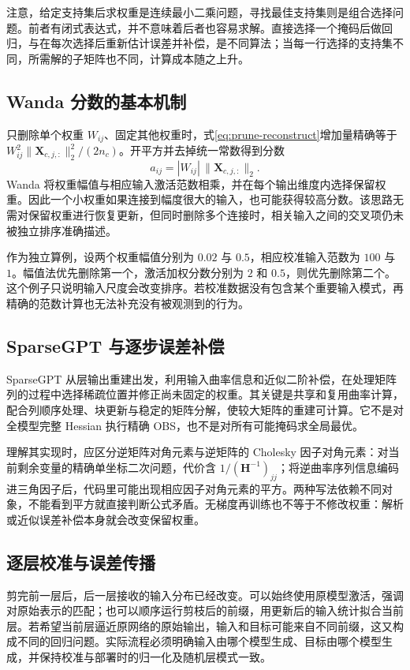 \documentclass[UTF8,12pt,a4paper,fontset=fandol]{ctexart}
\begin{document}
注意，给定支持集后求权重是连续最小二乘问题，寻找最佳支持集则是组合选择问题。前者有闭式表达式，并不意味着后者也容易求解。直接选择一个掩码后做回归，与在每次选择后重新估计误差并补偿，是不同算法；当每一行选择的支持集不同，所需解的子矩阵也不同，计算成本随之上升。

\subsection{Wanda 分数的基本机制}
只删除单个权重 $W_{ij}$、固定其他权重时，式\eqref{eq:prune-reconstruct}增加量精确等于 $W_{ij}^2\|\mathbf X_{c,j,:}\|_2^2/(2n_c)$。开平方并去掉统一常数得到分数
\begin{equation}
 a_{ij}=|W_{ij}|\,\|\mathbf X_{c,j,:}\|_2.
 \label{eq:prune-wanda}
\end{equation}
Wanda 将权重幅值与相应输入激活范数相乘，并在每个输出维度内选择保留权重\cite{sun2024}。因此一个小权重如果连接到幅度很大的输入，也可能获得较高分数。该思路无需对保留权重进行恢复更新，但同时删除多个连接时，相关输入之间的交叉项仍未被独立排序准确描述。

作为独立算例，设两个权重幅值分别为 $0.02$ 与 $0.5$，相应校准输入范数为 $100$ 与 $1$。幅值法优先删除第一个，激活加权分数分别为 $2$ 和 $0.5$，则优先删除第二个。这个例子只说明输入尺度会改变排序。若校准数据没有包含某个重要输入模式，再精确的范数计算也无法补充没有被观测到的行为。

\subsection{SparseGPT 与逐步误差补偿}
SparseGPT 从层输出重建出发，利用输入曲率信息和近似二阶补偿，在处理矩阵列的过程中选择稀疏位置并修正尚未固定的权重\cite{frantar2023}。其关键是共享和复用曲率计算，配合列顺序处理、块更新与稳定的矩阵分解，使较大矩阵的重建可计算。它不是对全模型完整 Hessian 执行精确 OBS，也不是对所有可能掩码求全局最优。

理解其实现时，应区分逆矩阵对角元素与逆矩阵的 Cholesky 因子对角元素：对当前剩余变量的精确单坐标二次问题，代价含 $1/(\mathbf H^{-1})_{jj}$；将逆曲率序列信息编码进三角因子后，代码里可能出现相应因子对角元素的平方。两种写法依赖不同对象，不能看到平方就直接判断公式矛盾。无梯度再训练也不等于不修改权重：解析或近似误差补偿本身就会改变保留权重。

\subsection{逐层校准与误差传播}
剪完前一层后，后一层接收的输入分布已经改变。可以始终使用原模型激活，强调对原始表示的匹配；也可以顺序运行剪枝后的前缀，用更新后的输入统计拟合当前层。若希望当前层逼近原网络的原始输出，输入和目标可能来自不同前缀，这又构成不同的回归问题。实际流程必须明确输入由哪个模型生成、目标由哪个模型生成，并保持校准与部署时的归一化及随机层模式一致。
\end{document}
